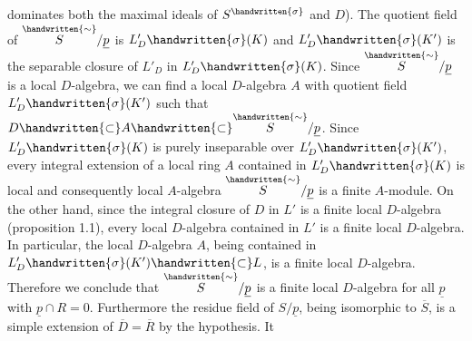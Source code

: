 dominates both the maximal ideals of $S^{\handwritten{\sigma}}$ and $D$). The quotient field of
$\overset{\handwritten{\sim}}{S}/\underline p$ is $L'_D\handwritten{\sigma}(K)$ and $L'_D\handwritten{\sigma}(K')$ is the separable closure of $L'_D$ in
$L'_D\handwritten{\sigma}(K)$. Since $\overset{\handwritten{\sim}}{S}/\underline p$ is a local $D$-algebra, we can find a local $D$-algebra
$A$ with quotient field $L'_D\handwritten{\sigma}(K')$ such that $D\handwritten{\subset} A\handwritten{\subset} \overset{\handwritten{\sim}}{S}/\underline p$. Since $L'_D\handwritten{\sigma}(K)$
is purely inseparable over $L'_D\handwritten{\sigma}(K')$, every integral extension of a local
ring $A$ contained in $L'_D\handwritten{\sigma}(K)$ is local and consequently local $A$-algebra
$\overset{\handwritten{\sim}}{S}/\underline p$ is a finite $A$-module. On the other hand, since the integral closure
of $D$ in $L'$ is a finite local $D$-algebra (proposition 1.1), every local $D$-algebra
contained in $L'$ is a finite local $D$-algebra. In particular, the
local $D$-algebra $A$, being contained in $L'_D\handwritten{\sigma}(K')\handwritten{\subset} L$, is a finite local
$D$-algebra. Therefore we conclude that $\overset{\handwritten{\sim}}{S}/\underline p$ is a finite local $D$-algebra
for all $\underline p$ with $\underline p\cap R=0$. Furthermore the residue field of $S/\underline p$, being
isomorphic to $\overline S$, is a simple extension of $\overline D=\overline R$ by the hypothesis. It
